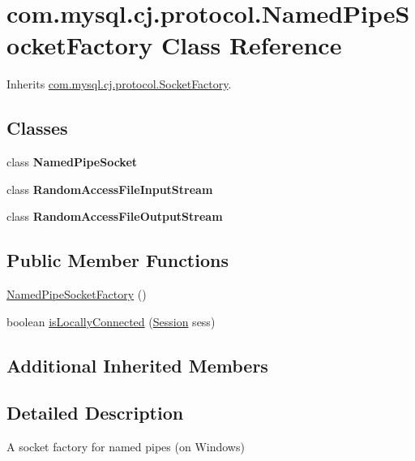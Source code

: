 \hypertarget{classcom_1_1mysql_1_1cj_1_1protocol_1_1_named_pipe_socket_factory}{}\section{com.\+mysql.\+cj.\+protocol.\+Named\+Pipe\+Socket\+Factory Class Reference}
\label{classcom_1_1mysql_1_1cj_1_1protocol_1_1_named_pipe_socket_factory}


Inherits \mbox{\hyperlink{interfacecom_1_1mysql_1_1cj_1_1protocol_1_1_socket_factory}{com.\+mysql.\+cj.\+protocol.\+Socket\+Factory}}.

\subsection*{Classes}
\begin{DoxyCompactItemize}
\item 
class {\bfseries Named\+Pipe\+Socket}
\item 
class {\bfseries Random\+Access\+File\+Input\+Stream}
\item 
class {\bfseries Random\+Access\+File\+Output\+Stream}
\end{DoxyCompactItemize}
\subsection*{Public Member Functions}
\begin{DoxyCompactItemize}
\item 
\mbox{\hyperlink{classcom_1_1mysql_1_1cj_1_1protocol_1_1_named_pipe_socket_factory_a171ec7b6055445fc5e8abda2ebaa5b63}{Named\+Pipe\+Socket\+Factory}} ()
\item 
boolean \mbox{\hyperlink{classcom_1_1mysql_1_1cj_1_1protocol_1_1_named_pipe_socket_factory_a4b84ec480d8301d7299bfc9ef2ef58ec}{is\+Locally\+Connected}} (\mbox{\hyperlink{interfacecom_1_1mysql_1_1cj_1_1_session}{Session}} sess)
\end{DoxyCompactItemize}
\subsection*{Additional Inherited Members}


\subsection{Detailed Description}
A socket factory for named pipes (on Windows) 

